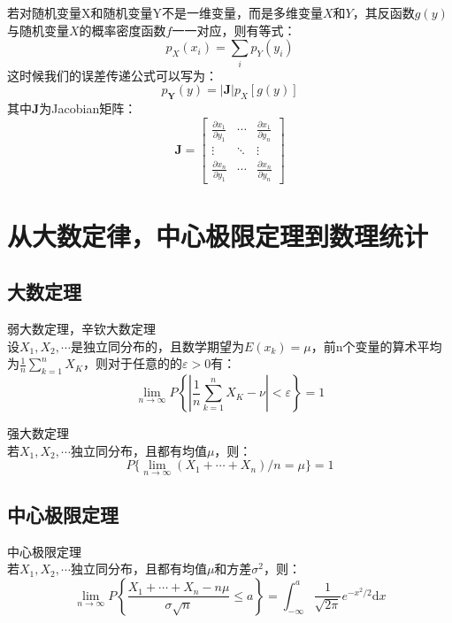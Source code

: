 若对随机变量X和随机变量Y不是一维变量，而是多维变量$X$和$Y$，其反函数$g(y)$与随机变量$X$的概率密度函数$f$一一对应，则有等式：
\begin{equation*}
    p_{X}(x_i) = \sum_i p_{Y}(y_i)
\end{equation*}
这时候我们的误差传递公式可以写为：
\begin{equation}
    p_\mathbf{Y}(y)=|\mathbf{J}|p_X[g(y)]
\end{equation}
其中$\mathbf{J}$为Jacobian矩阵：
\begin{equation}
    \mathbf{J}=
    \begin{bmatrix}
        \frac{\partial x_1}{\partial y_1} & \cdots & \frac{\partial x_1}{\partial y_n}\\
        \vdots & \ddots & \vdots \\
        \frac{\partial x_n}{\partial y_1} & \cdots  & \frac{\partial x_n}{\partial y_n}
    \end{bmatrix}
\end{equation}


\section{从大数定律，中心极限定理到数理统计}

\subsection{大数定理}
\begin{theorem}{弱大数定理，辛钦大数定理\\}
    设$X_1,X_2,\cdots$是独立同分布的，且数学期望为$E(x_k)=\mu$，前n个变量的算术平均为$\frac{1}{n}\sum_{k=1}^{n}X_K$，则对于任意的的$\varepsilon > 0$有：
    \begin{equation}
        \lim_{n\rightarrow \infty}P \left\{
        \left\lvert \frac{1}{n}\sum_{k=1}^{n}X_K - \nu \right \rvert < \varepsilon
        \right\}=1
    \end{equation}
\end{theorem}

\begin{theorem}{强大数定理\\}
    若$X_1,X_2,\cdots$独立同分布，且都有均值$\mu$，则：
    \begin{equation}
        P\{ \lim_{n\rightarrow \infty}(X_1+\cdots+X_n)/n=\mu \}=1
    \end{equation}
\end{theorem}


\subsection{中心极限定理}
\begin{theorem}{中心极限定理\\}
    若$X_1,X_2,\cdots$独立同分布，且都有均值$\mu$和方差$\sigma ^2$，则：
    \begin{equation}
        \lim_{n\rightarrow \infty} 
        P\left\{\frac{X_1+\cdots+X_n-n\mu}{\sigma \sqrt{n}}  \leq a \right\}=
        \int _{-\infty}^{a} \frac{1}{\sqrt{2\pi}}e^{-x^2/2}\mathrm{d}x
    \end{equation}
\end{theorem}


